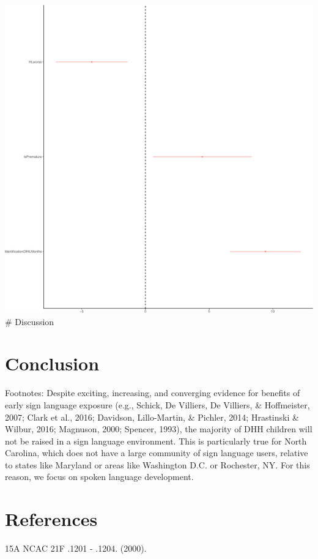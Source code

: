 \documentclass[english,man]{apa6}
\begin{document}
\includegraphics{ELSSP_paper_files/figure-latex/intervention-betas-1.pdf}
\# Discussion

\hypertarget{conclusion}{%
\section{Conclusion}\label{conclusion}}

Footnotes: Despite exciting, increasing, and converging evidence for benefits of early sign language exposure (e.g., Schick, De Villiers, De Villiers, \& Hoffmeister, 2007; Clark et al., 2016; Davidson, Lillo-Martin, \& Pichler, 2014; Hrastinski \& Wilbur, 2016; Magnuson, 2000; Spencer, 1993), the majority of DHH children will not be raised in a sign language environment. This is particularly true for North Carolina, which does not have a large community of sign language users, relative to states like Maryland or areas like Washington D.C. or Rochester, NY. For this reason, we focus on spoken language development.

\hypertarget{references}{%
\section*{References}\label{references}}

\hypertarget{refs}{}
\leavevmode\hypertarget{ref-2000}{}%
15A NCAC 21F .1201 - .1204. (2000).
\end{document}
